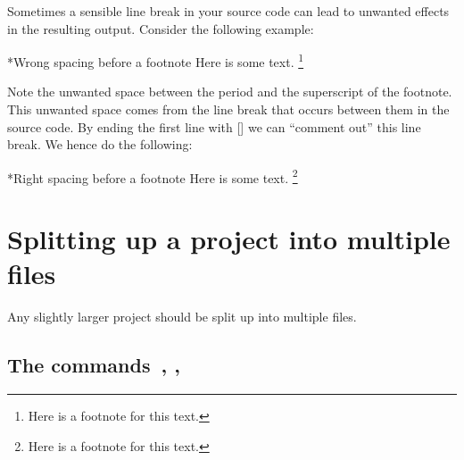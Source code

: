 Sometimes a sensible line break in your source code can lead to unwanted effects in the resulting output.
Consider the following example:
\begin{showlatex}*{Wrong spacing before a footnote}
Here is some text.
\footnote{Here is a footnote for this text.}
\end{showlatex}
Note the unwanted space between the period and the superscript of the footnote.
This unwanted space comes from the line break that occurs between them in the source code.
By ending the first line with \inlinecode{\%}\massindex{\%}[\inlinecode] we can \enquote{comment out} this line break.
We hence do the following:
\begin{showlatex}*{Right spacing before a footnote}
Here is some text.%
\footnote{Here is a footnote for this text.}
\end{showlatex}





\section{Splitting up a project into multiple files}

Any slightly larger project should be split up into multiple files.



\subsection{The commands~, , }

